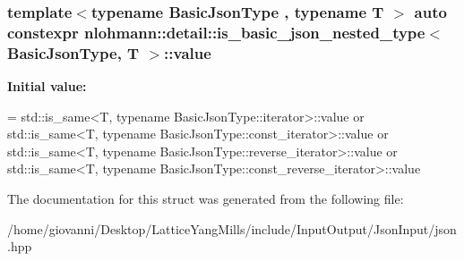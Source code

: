 \subsubsection[{\texorpdfstring{value}{value}}]{\setlength{\rightskip}{0pt plus 5cm}template$<$typename Basic\+Json\+Type , typename T $>$ auto constexpr {\bf nlohmann\+::detail\+::is\+\_\+basic\+\_\+json\+\_\+nested\+\_\+type}$<$ Basic\+Json\+Type, T $>$\+::value\hspace{0.3cm}{\ttfamily [static]}}\hypertarget{structnlohmann_1_1detail_1_1is__basic__json__nested__type_aee5fee744e5298a78d557f2ee5f090db}{}\label{structnlohmann_1_1detail_1_1is__basic__json__nested__type_aee5fee744e5298a78d557f2ee5f090db}
{\bfseries Initial value\+:}
\begin{DoxyCode}
= std::is\_same<T, typename BasicJsonType::iterator>::value or
                                  std::is\_same<T, typename BasicJsonType::const\_iterator>::value or
                                  std::is\_same<T, typename BasicJsonType::reverse\_iterator>::value or
                                  std::is\_same<T, typename BasicJsonType::const\_reverse\_iterator>::value
\end{DoxyCode}


The documentation for this struct was generated from the following file\+:\begin{DoxyCompactItemize}
\item 
/home/giovanni/\+Desktop/\+Lattice\+Yang\+Mills/include/\+Input\+Output/\+Json\+Input/json.\+hpp\end{DoxyCompactItemize}
